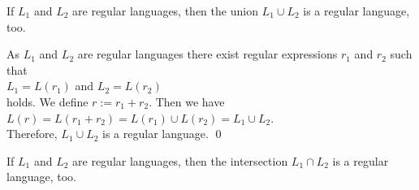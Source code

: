 \begin{Proposition}
  If $L_1$ and $L_2$ are regular languages, then the union $L_1 \cup L_2$ is a regular language, too.
\end{Proposition}

\proofEng
As $L_1$ and $L_2$ are regular languages there exist regular expressions $r_1$ and $r_2$ such that
\\[0.2cm]
\hspace*{1.3cm}
$L_1 = L(r_1)$ \quad and \quad $L_2 = L(r_2)$
\\[0.2cm]
holds.  We define $r := r_1 + r_2$.  Then we have
\\[0.2cm]
\hspace*{1.3cm}
$L(r) = L(r_1 + r_2) = L(r_1) \cup L(r_2) = L_1 \cup L_2$.
\\[0.2cm]
Therefore,  $L_1 \cup L_2$ is a regular language. \qed

\begin{Proposition} \label{satz:schnitt}
  If  $L_1$ and $L_2$ are regular languages, then the intersection $L_1 \cap L_2$ is a regular language, too.
\end{Proposition}

\proofEng

